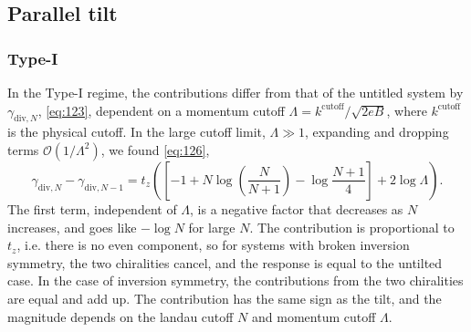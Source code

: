 \FloatBarrier
\subsection{Parallel tilt}
\subsubsection{Type-I}
In the Type-I regime, the contributions differ from that of the untitled system by \( \gamma_{\text{div}, N} \), \cref{eq:123}, dependent on a momentum cutoff \( \Lambda = k^{\text{cutoff}} /\sqrt{2 e B}  \), where \(k^{\text{cutoff}}\) is the physical cutoff.
In the large cutoff limit, \( \Lambda \gg 1 \), expanding and dropping terms \( \mathcal{O}(1 /\Lambda^2) \), we found \cref{eq:126},
\[
  \gamma_{\text{div}, N} - \gamma_{\text{div}, N-1} =
  t_z
  \left(
    \left[
      -1 + N \log\left(\frac{N}{N+1}\right) - \log \frac{N+1}{4}
    \right]
    + 2 \log\Lambda
  \right).
\]
The first term, independent of \( \Lambda \), is a negative factor that decreases as \( N \) increases, and goes like \( -\log N \) for large \( N \).
The contribution is proportional to \( t_z \), i.e. there is no even component, so for systems with broken inversion symmetry, the two chiralities cancel, and the response is equal to the untilted case.
In the case of inversion symmetry, the contributions from the two chiralities are equal and add up.
The contribution has the same sign as the tilt, and the magnitude depends on the landau cutoff \( N \) and momentum cutoff \( \Lambda \).


